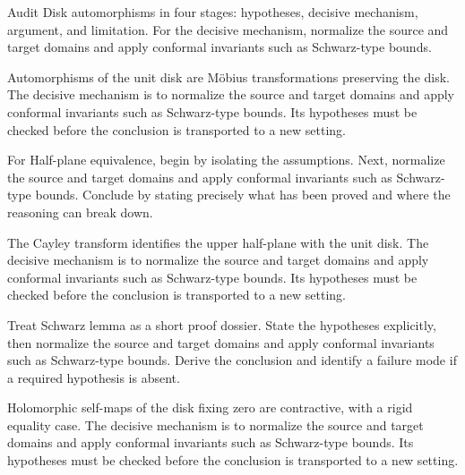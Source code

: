 \begin{problem}\label{prob:iv17-problem-05}
Audit Disk automorphisms in four stages: hypotheses, decisive mechanism, argument, and limitation. For the decisive mechanism, normalize the source and target domains and apply conformal invariants such as Schwarz-type bounds.
\end{problem}
\begin{solution}
Automorphisms of the unit disk are Möbius transformations preserving the disk. The decisive mechanism is to normalize the source and target domains and apply conformal invariants such as Schwarz-type bounds. Its hypotheses must be checked before the conclusion is transported to a new setting.
\end{solution}

\begin{problem}\label{prob:iv17-problem-06}
For Half-plane equivalence, begin by isolating the assumptions. Next, normalize the source and target domains and apply conformal invariants such as Schwarz-type bounds. Conclude by stating precisely what has been proved and where the reasoning can break down.
\end{problem}
\begin{solution}
The Cayley transform identifies the upper half-plane with the unit disk. The decisive mechanism is to normalize the source and target domains and apply conformal invariants such as Schwarz-type bounds. Its hypotheses must be checked before the conclusion is transported to a new setting.
\end{solution}

\begin{problem}\label{prob:iv17-problem-07}
Treat Schwarz lemma as a short proof dossier. State the hypotheses explicitly, then normalize the source and target domains and apply conformal invariants such as Schwarz-type bounds. Derive the conclusion and identify a failure mode if a required hypothesis is absent.
\end{problem}
\begin{solution}
Holomorphic self-maps of the disk fixing zero are contractive, with a rigid equality case. The decisive mechanism is to normalize the source and target domains and apply conformal invariants such as Schwarz-type bounds. Its hypotheses must be checked before the conclusion is transported to a new setting.
\end{solution}

